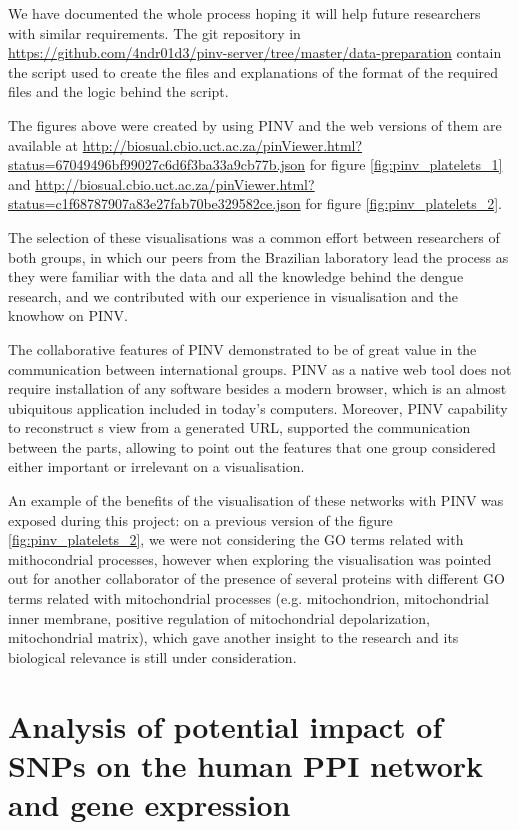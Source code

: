 We have documented the whole process hoping it will help future researchers with similar requirements. The git repository in \url{https://github.com/4ndr01d3/pinv-server/tree/master/data-preparation} contain the script used to create the files and explanations of the format of the required files and the logic behind the script.

The figures above were created by using PINV and the web versions of them are available at \url{http://biosual.cbio.uct.ac.za/pinViewer.html?status=67049496bf99027c6d6f3ba33a9cb77b.json} for figure \ref{fig:pinv_platelets_1} and \url{http://biosual.cbio.uct.ac.za/pinViewer.html?status=c1f68787907a83e27fab70be329582ce.json} for figure \ref{fig:pinv_platelets_2}.

The selection of these visualisations was a common effort between researchers of both groups, in which our peers from the Brazilian laboratory lead the process as they were familiar with the data and all the knowledge behind the dengue research, and we contributed with our experience in visualisation and the knowhow on PINV.

The collaborative features of PINV demonstrated to be of great value in the communication between international groups. PINV as a native web tool does not require installation of any software besides a modern browser, which is an almost ubiquitous application included in today's computers. Moreover, PINV capability to reconstruct s view from a generated URL, supported the communication between the parts, allowing to point out the features that one group considered either important or irrelevant on a visualisation.

An example of the benefits of the visualisation of these networks with PINV was exposed during this project: on a previous version of the figure \ref{fig:pinv_platelets_2}, we were not considering the GO terms related with mithocondrial processes, however when exploring the visualisation was pointed out for another collaborator of the presence of several proteins with different GO terms related with mitochondrial processes (e.g.  mitochondrion, mitochondrial inner membrane, positive regulation of mitochondrial depolarization, mitochondrial matrix), which gave another insight to the research and its biological relevance is still under consideration.



\section{Analysis of potential impact of SNPs on the human PPI network and gene expression}
\label{sec:pop_genetics}
